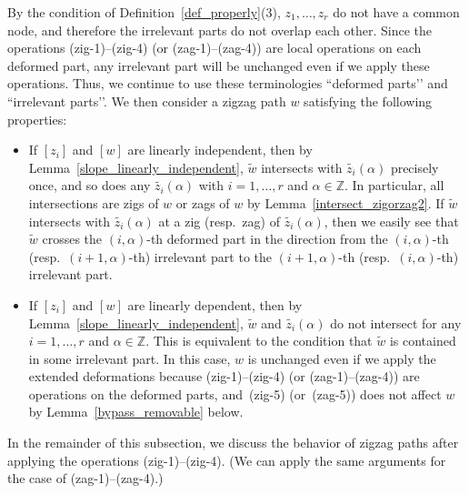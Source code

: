 \documentclass[11pt]{article}
\numberwithin{equation}{section}
\numberwithin{equation}{section}
\numberwithin{figure}{section}
\numberwithin{table}{section}
\newcommand{\ZZ}{\mathbb{Z}}
\begin{document}
\begin{observation}
By the condition of Definition~\ref{def_properly}(3), $z_1,\dots,z_r$ do not have a common node, and therefore the irrelevant parts do not overlap each other.
Since the operations (zig-1)--(zig-4) (or (zag-1)--(zag-4)) are local operations on each deformed part, any irrelevant part will be unchanged even if we apply these operations.
Thus, we continue to use these terminologies ``deformed parts’’ and ``irrelevant parts’’.
We then consider a zigzag path $w$ satisfying the following properties:
\begin{itemize}\itemsep=0pt
\item[(a)] If $[z_i]$ and $[w]$ are linearly independent, then by Lemma~\ref{slope_linearly_independent}, $\widetilde{w}$ intersects with $\widetilde{z_i}(\alpha)$ precisely once, and so does any $\widetilde{z_i}(\alpha)$ with $i=1,\dots,r$ and $\alpha\in\ZZ$.
In particular, all intersections are zigs of $w$ or zags of $w$ by Lemma~\ref{intersect_zigorzag2}.
If $\widetilde{w}$ intersects with $\widetilde{z_i}(\alpha)$ at a zig (resp.\ zag) of $\widetilde{z_i}(\alpha)$, then we easily see that $\widetilde{w}$ crosses the $(i,\alpha)$-th deformed part in the direction from the $(i,\alpha)$-th (resp.~$(i+1,\alpha)$-th) irrelevant part to the $(i+1,\alpha)$-th (resp.~$(i,\alpha)$-th) irrelevant part.

\item[(b)] If $[z_i]$ and $[w]$ are linearly dependent, then by Lemma~\ref{slope_linearly_independent}, $\widetilde{w}$ and $\widetilde{z_i}(\alpha)$ do not intersect for any $i=1,\dots,r$ and $\alpha\in\ZZ$.
This is equivalent to the condition that $\widetilde{w}$ is contained in some irrelevant part.
In this case, $w$ is unchanged even if we apply the extended deformations because (zig-1)--(zig-4) (or (zag-1)--(zag-4)) are operations on the deformed parts, and~(zig-5) (or~(zag-5)) does not affect $w$ by Lemma~\ref{bypass_removable} below.
\end{itemize}
\end{observation}

In the remainder of this subsection, we discuss the behavior of zigzag paths after applying the operations (zig-1)--(zig-4).
(We can apply the same arguments for the case of (zag-1)--(zag-4).)
\end{document}
